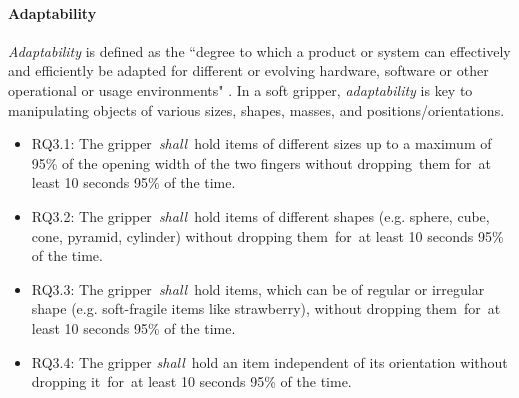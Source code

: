 \documentclass[lettersize,journal]{IEEEtran}
\begin{document}
\paragraph{Adaptability} \label{adaptability}
\emph{Adaptability} is defined as the ``degree to which a product or system can effectively and efficiently be adapted for different or evolving hardware, software or other operational or usage environments" \cite{ISO24765:2017}. In a soft gripper, \emph{adaptability} is key to manipulating objects of various sizes, shapes, masses, and positions/orientations. 
\begin{itemize}
	\item RQ3.1: The gripper \emph{shall} hold items of different sizes up to a maximum of 95\% of the opening width of the two fingers without dropping them for at least 10 seconds 95\% of the time.
	\item RQ3.2: The gripper \emph{shall} hold items of different shapes (e.g. sphere, cube, cone, pyramid, cylinder) without dropping them for at least 10 seconds 95\% of the time.
	\item RQ3.3: The gripper \emph{shall} hold items, which can be of regular or irregular shape (e.g. soft-fragile items like strawberry), without dropping them for at least 10 seconds 95\% of the time.
	\item RQ3.4: The gripper \emph{shall} hold an item independent of its orientation without dropping it for at least 10 seconds 95\% of the time. 	  
\end{itemize}
%
%
\end{document}
